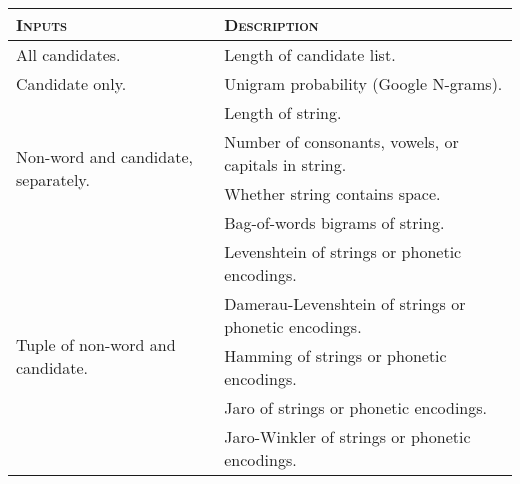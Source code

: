     \begin{tabular}{p{3cm}|l}
    \textsc{Inputs} & \textsc{Description} \\
\hline
All candidates. & Length of candidate list. \\
\hline
Candidate only. & Unigram probability (Google N-grams). \\
\hline
\multirow{4}{3cm}{Non-word and candidate, separately.} & Length of string. \\ 
& Number of consonants, vowels, or capitals in string. \\
& Whether string contains space. \\
& Bag-of-words bigrams of string. \\
\hline
\multirow{5}{3cm}{Tuple of non-word and candidate.} & Levenshtein of strings or phonetic encodings. \\
& Damerau-Levenshtein of strings or phonetic encodings. \\
& Hamming of strings or phonetic encodings. \\
& Jaro of strings or phonetic encodings. \\
& Jaro-Winkler of strings or phonetic encodings. \\
\end{tabular}